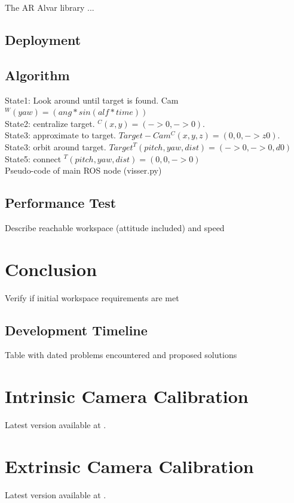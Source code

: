 \documentclass[11pt]{article}
\begin{document}
        The AR Alvar library ... %
        
    \subsection{Deployment}
        
        
    \subsection{Algorithm}
        State1: Look around until target is found. Cam $^W(yaw) = (ang*sin(alf*time))$\\
        State2: centralize target. $^C(x,y) = (->0, ->0).$\\
        State3: approximate to target. $Target-Cam ^C(x,y,z) = (0,0,->z0). $\\
        State3: orbit around target. $Target ^T(pitch,yaw,dist) = (->0,->0,d0)$\\
        State5: connect $^T(pitch,yaw,dist) = (0,0,->0)$\\
        
        Pseudo-code of main ROS node (visser.py)
    
    \subsection{Performance Test}
        Describe reachable workspace (attitude included) and speed

\section{Conclusion}
    Verify if initial workspace requirements are met

    \subsection{Development Timeline}
        Table with dated problems encountered and proposed solutions
        
\printbibliography
    
\clearpage    
\appendix
\appendixpage


\section{Intrinsic Camera Calibration}
Latest version available at \cite{intCalibration}.


\section{Extrinsic Camera Calibration}
Latest version available at \cite{extCalibration}.

\end{document}
